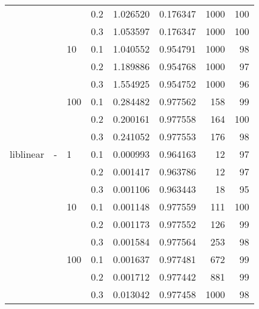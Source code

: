 \begin{table}[H]
\begin{tabular}{llllrrrr}
          &   &     & 0.2 &  1.026520 &  0.176347 &    1000 &   100 \\
          &   &     & 0.3 &  1.053597 &  0.176347 &    1000 &   100 \\
          &   & 10  & 0.1 &  1.040552 &  0.954791 &    1000 &    98 \\
          &   &     & 0.2 &  1.189886 &  0.954768 &    1000 &    97 \\
          &   &     & 0.3 &  1.554925 &  0.954752 &    1000 &    96 \\
          &   & 100 & 0.1 &  0.284482 &  0.977562 &     158 &    99 \\
          &   &     & 0.2 &  0.200161 &  0.977558 &     164 &   100 \\
          &   &     & 0.3 &  0.241052 &  0.977553 &     176 &    98 \\
liblinear & - & 1   & 0.1 &  0.000993 &  0.964163 &      12 &    97 \\
          &   &     & 0.2 &  0.001417 &  0.963786 &      12 &    97 \\
          &   &     & 0.3 &  0.001106 &  0.963443 &      18 &    95 \\
          &   & 10  & 0.1 &  0.001148 &  0.977559 &     111 &   100 \\
          &   &     & 0.2 &  0.001173 &  0.977552 &     126 &    99 \\
          &   &     & 0.3 &  0.001584 &  0.977564 &     253 &    98 \\
          &   & 100 & 0.1 &  0.001637 &  0.977481 &     672 &    99 \\
          &   &     & 0.2 &  0.001712 &  0.977442 &     881 &    99 \\
          &   &     & 0.3 &  0.013042 &  0.977458 &    1000 &    98 \\
\bottomrule
\end{tabular}
\end{table}
